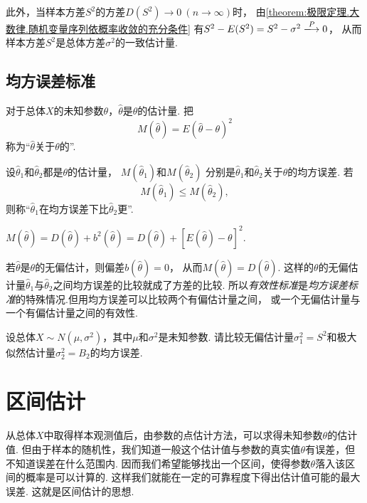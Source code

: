 此外，当样本方差\(S^2\)的方差\(D(S^2) \to 0\ (n\to\infty)\)时，
由\cref{theorem:极限定理.大数律.随机变量序列依概率收敛的充分条件}
有\(S^2 - E(S^2) = S^2 - \sigma^2 \toP 0\)，
从而样本方差\(S^2\)是总体方差\(\sigma^2\)的一致估计量.

\subsection{均方误差标准}
\begin{definition}
对于总体\(X\)的未知参数\(\theta\)，\(\hat{\theta}\)是\(\theta\)的估计量.
把\[
	M(\hat{\theta}) = E(\hat{\theta} - \theta)^2
\]称为“\(\hat{\theta}\)关于\(\theta\)的”.
\end{definition}

\begin{definition}
设\(\hat{\theta}_1\)和\(\hat{\theta}_2\)都是\(\theta\)的估计量，
\(M(\hat{\theta}_1)\)和\(M(\hat{\theta}_2)\)
分别是\(\hat{\theta}_1\)和\(\hat{\theta}_2\)关于\(\theta\)的均方误差.
若\[
	M(\hat{\theta}_1) \leq M(\hat{\theta}_2),
\]
则称“\(\hat{\theta}_1\)在均方误差下比\(\hat{\theta}_2\)更”.
\end{definition}

\begin{theorem}
\(M(\hat{\theta}) = D(\hat{\theta}) + b^2(\hat{\theta})
= D(\hat{\theta}) + [E(\hat{\theta}) - \theta]^2.\)
\end{theorem}
若\(\hat{\theta}\)是\(\theta\)的无偏估计，则偏差\(b(\hat{\theta})=0\)，
从而\(M(\hat{\theta})=D(\hat{\theta})\).
这样的\(\theta\)的无偏估计量\(\hat{\theta}_1\)与\(\hat{\theta}_2\)之间均方误差的比较就成了方差的比较.
所以\emph{有效性标准}是\emph{均方误差标准}的特殊情况.但用均方误差可以比较两个有偏估计量之间，
或一个无偏估计量与一个有偏估计量之间的有效性.

\begin{example}
设总体\(X \sim N(\mu,\sigma^2)\)，其中\(\mu\)和\(\sigma^2\)是未知参数.
请比较无偏估计量\(\sigma_1^2=S^2\)和极大似然估计量\(\sigma_2^2=B_2\)的均方误差.
\end{example}

\section{区间估计}
从总体\(X\)中取得样本观测值后，由参数的点估计方法，可以求得未知参数\(\theta\)的估计值.
但由于样本的随机性，我们知道一般这个估计值与参数的真实值\(\theta\)有误差，但不知道误差在什么范围内.
因而我们希望能够找出一个区间，使得参数\(\theta\)落入该区间的概率是可以计算的.
这样我们就能在一定的可靠程度下得出估计值可能的最大误差.
这就是区间估计的思想.

